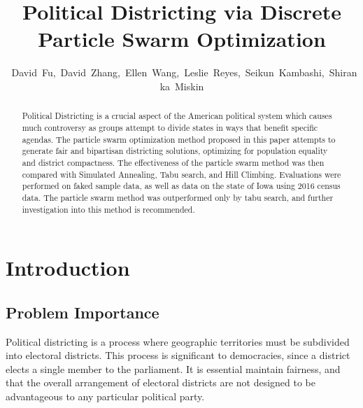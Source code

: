 \documentclass[journal]{IEEEtran}
\begin{document}
\title{Political Districting via Discrete Particle Swarm Optimization}
\author{~David~Fu,~David~Zhang,~Ellen~Wang,~Leslie~Reyes,~Seikun~Kambashi,~Shiranka~Miskin}
\maketitle

\begin{abstract}
Political Districting is a crucial aspect of the American political system which
    causes much controversy as groups attempt to divide states in ways that
    benefit specific agendas.  The particle swarm optimization method proposed
    in this paper attempts to generate fair and bipartisan districting
    solutions, optimizing for population equality and district compactness.  The
    effectiveness of the particle swarm method was then compared with Simulated
    Annealing, Tabu search, and Hill Climbing.  Evaluations were performed on
    faked sample data, as well as data on the state of Iowa using 2016 census
    data.  The particle swarm method was outperformed only by tabu search, and
    further investigation into this method is recommended.
\end{abstract}

\section{Introduction}
\subsection{Problem Importance}
Political districting\cite{redistricting} is a process where geographic territories must be
subdivided into electoral districts. This process is significant to democracies,
since a district elects a single member to the parliament. It is essential
maintain fairness, and that the overall arrangement of electoral districts are
not designed to be advantageous to any particular political party.
\end{document}
